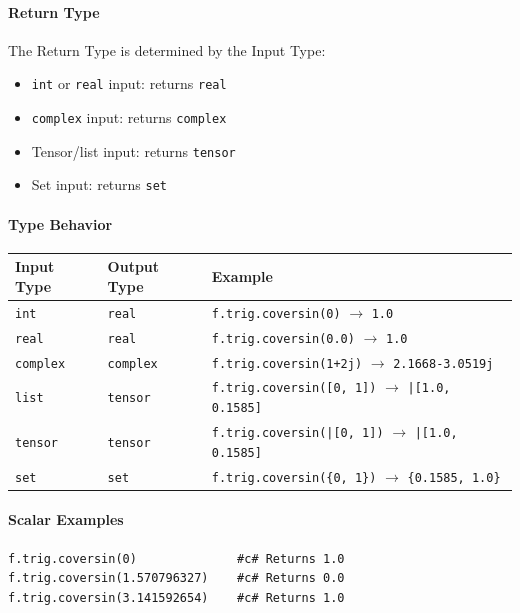 \paragraph{Return Type}
The Return Type is determined by the Input Type:
\begin{itemize}
\item \texttt{int} or \texttt{real} input: returns \texttt{real}
\item \texttt{complex} input: returns \texttt{complex}
\item Tensor/list input: returns \texttt{tensor}
\item Set input: returns \texttt{set}
\end{itemize}

\paragraph{Type Behavior}
\begin{center}
\begin{tabular}{lll}
\textbf{Input Type} & \textbf{Output Type} & \textbf{Example} \\ \hline
\texttt{int} & \texttt{real} & \texttt{f.trig.coversin(0)} $\to$ \texttt{1.0} \\
\texttt{real} & \texttt{real} & \texttt{f.trig.coversin(0.0)} $\to$ \texttt{1.0} \\
\texttt{complex} & \texttt{complex} & \texttt{f.trig.coversin(1+2j)} $\to$ \texttt{2.1668-3.0519j} \\
\texttt{list} & \texttt{tensor} & \texttt{f.trig.coversin([0, 1])} $\to$ \texttt{|[1.0, 0.1585]} \\
\texttt{tensor} & \texttt{tensor} & \texttt{f.trig.coversin(|[0, 1])} $\to$ \texttt{|[1.0, 0.1585]} \\
\texttt{set} & \texttt{set} & \texttt{f.trig.coversin(\{0, 1\})} $\to$ \texttt{\{0.1585, 1.0\}} \\
\end{tabular}
\end{center}

\paragraph{Scalar Examples}
\begin{verbatim}
f.trig.coversin(0)              #c# Returns 1.0
f.trig.coversin(1.570796327)    #c# Returns 0.0
f.trig.coversin(3.141592654)    #c# Returns 1.0
\end{verbatim}

